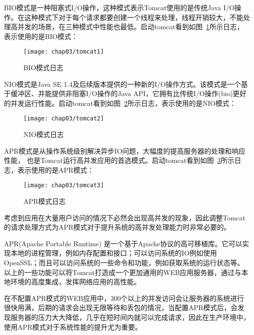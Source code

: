 BIO模式是一种阻塞式I/O操作，这种模式表示Tomcat使用的是传统Java I/O操作。在这种模式下对于每个请求都要创建一个线程来处理，线程开销较大，不能处理高并发的场景，在三种模式中性能也最低。启动tomcat看到如图~\ref{fig:tomcat1}所示日志，表示使用的是BIO模式：
\begin{figure}[H] %
  \centering
  \texttt{[image: chap03/tomcat1]}
  \caption{BIO模式日志}
  \label{fig:tomcat1}
\end{figure}
NIO模式是Java SE 1.4及后续版本提供的一种新的I/O操作方式。该模式是一个基于缓冲区、并能提供非阻塞I/O操作的Java API，它拥有比传统I/O操作(bio)更好的并发运行性能。启动tomcat看到如图~\ref{fig:tomcat2}所示日志，表示使用的是NIO模式：
\begin{figure}[H] %
  \centering
  \texttt{[image: chap03/tomcat2]}
  \caption{NIO模式日志}
  \label{fig:tomcat2}
\end{figure}
APR模式是从操作系统级别解决异步IO问题，大幅度的提高服务器的处理和响应性能， 也是Tomcat运行高并发应用的首选模式。启动tomcat看到如图~\ref{fig:tomcat3}所示日志，表示使用的是APR模式：
\begin{figure}[H] %
  \centering
  \texttt{[image: chap03/tomcat3]}
  \caption{APR模式日志}
  \label{fig:tomcat3}
\end{figure}
考虑到应用在大量用户访问的情况下必然会出现高并发的现象，因此调整Tomcat的请求处理方式为APR模式对于提升系统的高并发处理能力时非常必要的\cite{蒋文旭2012大型高并发}。

APR(Apache Portable Runtime) 是一个基于Apache协议的高可移植库。它可以实现本地的进程管理，例如内存配置和接口；可以访问系统的IO例如使用OpenSSL；而且可以访问系统的一些命令和功能，例如获取系统的运行状态等。以上的一些功能可以将Tomcat打造成一个更加通用的WEB应用服务器，通过与本地环境的高度集成，发挥网络应用的高性能\cite{Tomcat性能调优}。

在不配置APR模式的WEB应用中，300个以上的并发访问会让服务器的系统进行很快用满，后期的请求会出现无限等待和丢包的情况，当配置APR模式后，会发现服务器的压力大大降低\cite{vukotic2011embedding}，几乎在短时间内就可以完成请求，因此在生产环境中，使用APR模式对于系统性能的提升尤为重要。
